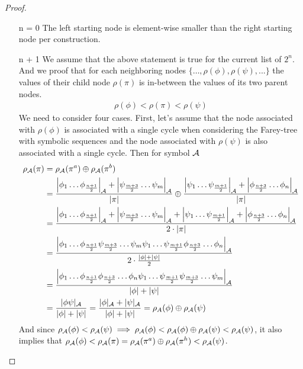 \begin{proof}
	\begin{itemize}
		\item[n = 0] The left starting node is element-wise smaller than the right starting node per construction.
		\item[n + 1] We assume that the above statement is true for the current list of $2^n$.
			And we proof that for each neighboring nodes $\{\dots ,\rho(\phi), \rho(\psi), ...\}$ the values of their child node $\rho(\pi)$ is in-between the values of its two parent nodes.
			\begin{align*}
				\rho(\phi) < \rho(\pi) < \rho(\psi)
			\end{align*}
			We need to consider four cases.
			First, let's assume that the node associated with $\rho(\phi)$ is associated with a single cycle when considering the Farey-tree with symbolic sequences and the node associated with $\rho(\psi)$ is also associated with a single cycle.
			Then for symbol $\mathcal{A}$
			\begin{align*}
				\rho_{\mathcal{A}}(\pi) & = \rho_{\mathcal{A}}(\pi^a) \oplus \rho_{\mathcal{A}}(\pi^b)                                                                       \\
				             & =
				\dfrac{\left|\phi_1 \dots \phi_{\frac{n+1}{2}}\right|_{\mathcal{A}} + \left|\psi_{\frac{m+3}{2}} \dots \psi_m\right|_{\mathcal{A}}}{|\pi|}
				\oplus \dfrac{\left|\psi_1 \dots \psi_{\frac{m+1}{2}}\right|_{\mathcal{A}} + \left|\phi_{\frac{n+3}{2}} \dots \phi_n\right|_{\mathcal{A}}}{|\pi|} \\
				             & =
				\dfrac
				{\left|\phi_1 \dots \phi_{\frac{n+1}{2}}\right|_{\mathcal{A}} + \left|\psi_{\frac{m+3}{2}} \dots \psi_m\right|_{\mathcal{A}} + \left|\psi_1 \dots \psi_{\frac{m+1}{2}}\right|_{\mathcal{A}} + \left|\phi_{\frac{n+3}{2}} \dots \phi_n\right|_{\mathcal{A}}}
				{2 \cdot |\pi|}                                                                                                             \\
				             & =
				\dfrac
				{\left|\phi_1 \dots \phi_{\frac{n+1}{2}} \psi_{\frac{m+3}{2}} \dots \psi_m \psi_1 \dots \psi_{\frac{m+1}{2}} \phi_{\frac{n+3}{2}} \dots \phi_n\right|_{\mathcal{A}}}
				{2 \cdot \frac{|\phi| + |\psi|}{2}}                                                                                         \\
				             & =
				\dfrac
				{\left|\phi_1 \dots \phi_{\frac{n+1}{2}} \phi_{\frac{n+3}{2}} \dots \phi_n \psi_1 \dots \psi_{\frac{m+1}{2}} \psi_{\frac{m+3}{2}} \dots \psi_m\right|_{\mathcal{A}}}
				{|\phi| + |\psi|}                                                                                                           \\
				             &
				= \dfrac{|\phi\psi|_{\mathcal{A}}}{|\phi| + |\psi|}
				= \dfrac{|\phi|_{\mathcal{A}} + |\psi|_{\mathcal{A}}}{|\phi| + |\psi|}
				= \rho_A(\phi) \oplus \rho_{\mathcal{A}}(\psi)
			\end{align*}
			And since $\rho_{\mathcal{A}}(\phi) < \rho_{\mathcal{A}}(\psi) \implies \rho_{\mathcal{A}}(\phi) < \rho_{\mathcal{A}}(\phi) \oplus \rho_{\mathcal{A}}(\psi) < \rho_{\mathcal{A}}(\psi)$,
			it also implies that $\rho_{\mathcal{A}}(\phi) < \rho_{\mathcal{A}}(\pi) =  \rho_{\mathcal{A}}(\pi^a) \oplus \rho_{\mathcal{A}}(\pi^h) < \rho_{\mathcal{A}}(\psi)$.


\end{itemize}
\end{proof}
